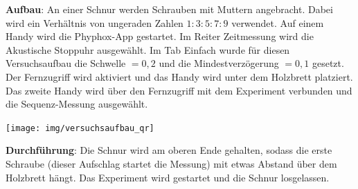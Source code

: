 \documentclass[../main.tex]{subfiles}
\begin{document}
\begin{tcolorbox}
\begin{minipage}[]{0.75\textwidth}
        \vspace{0.4cm}
        \textbf{Aufbau}: An einer Schnur werden Schrauben mit Muttern angebracht. Dabei wird ein Verhältnis von ungeraden Zahlen $1:3:5:7:9$ verwendet. Auf einem Handy wird die Phyphox-App gestartet. Im Reiter \glqq Zeitmessung\grqq{} wird die \glqq Akustische Stoppuhr\grqq{} ausgewählt. Im Tab \glqq Einfach\grqq{} wurde für diesen Versuchsaufbau die Schwelle $=0,2$ und die Mindestverzögerung $=0,1$ gesetzt. Der Fernzugriff wird aktiviert und das Handy wird unter dem Holzbrett platziert. Das zweite Handy wird über den Fernzugriff mit dem Experiment verbunden und die \glqq Sequenz\grqq{}-Messung ausgewählt.
    \end{minipage}
    \hspace{0.3cm}
    \begin{minipage}[]{0.2\textwidth}
        \texttt{[image: img/versuchsaufbau\_qr]}
    \end{minipage}

    \vspace{-0.7cm}
    \begin{minipage}[]{0.7\textwidth}
        \textbf{Durchführung}:   Die Schnur wird am oberen Ende gehalten, sodass die erste Schraube (dieser Aufschlag startet die Messung) mit etwas Abstand über dem Holzbrett hängt. Das Experiment wird gestartet und die Schnur losgelassen.


\end{minipage}
\end{tcolorbox}
\end{document}
